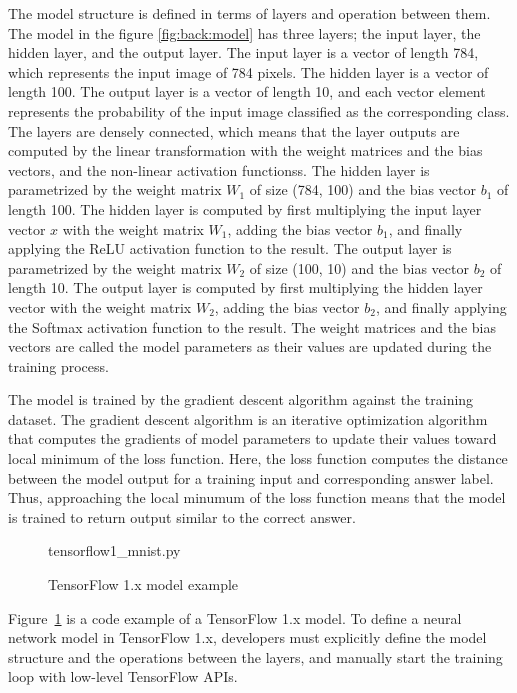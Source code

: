 The model structure is defined in terms of layers and operation between them.
The model in the figure \ref{fig:back:model} has three layers;
the input layer, the hidden layer, and the output layer.
The input layer is a vector of length 784, which represents the input image
of 784 pixels.
The hidden layer is a vector of length 100.
The output layer is a vector of length 10, and each vector element represents 
the probability of the input image classified as the corresponding class.
The layers are densely connected, which means that
the layer outputs are computed by the linear transformation with 
the weight matrices and the bias vectors, 
and the non-linear activation functionss. 
The hidden layer is parametrized by the weight matrix
$W_1$ of size (784, 100) and the bias vector $b_1$ of length 100.
The hidden layer is computed by first multiplying the input layer vector $x$
with the weight matrix $W_1$, adding the bias vector $b_1$, and finally applying
the ReLU activation function to the result.
The output layer is parametrized by the weight matrix $W_2$ of size (100, 10)
and the bias vector $b_2$ of length 10.
The output layer is computed by first multiplying the hidden layer vector
with the weight matrix $W_2$, adding the bias vector $b_2$, and finally applying
the Softmax activation function to the result.
The weight matrices and the bias vectors are called the model parameters 
as their values are updated during the training process.

The model is trained by the gradient descent algorithm against the training
dataset. The gradient descent algorithm is an iterative optimization algorithm
that computes the gradients of model parameters to update their values toward
local minimum of the loss function.
Here, the loss function computes the distance between the model output for
a training input and corresponding answer label.
Thus, approaching the local minumum of the loss function means that the
model is trained to return output similar to the correct answer.

\begin{figure}[ht!]

{tensorflow1_mnist.py}
  \caption{TensorFlow 1.x model example}
\label{fig:back:tf1}
\end{figure}

Figure~\ref{fig:back:tf1} is a code example of a TensorFlow 1.x model.
To define a neural network model in TensorFlow 1.x, 
developers must explicitly define the model structure
and the operations between the layers, 
and manually start the training loop with low-level TensorFlow APIs.

